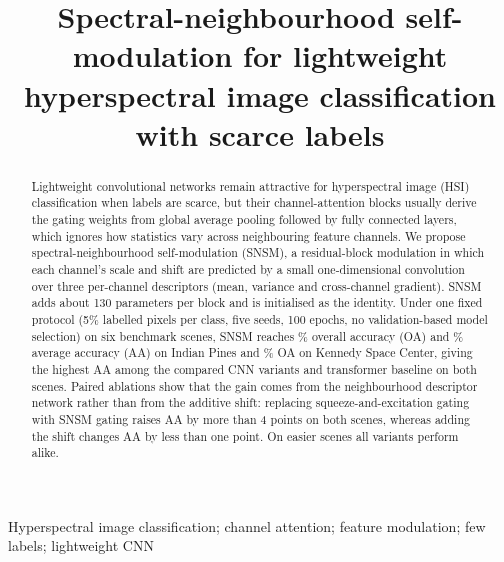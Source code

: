 \documentclass[]{interact}
\begin{document}

\title{Spectral-neighbourhood self-modulation for lightweight hyperspectral image classification with scarce labels}

\author{
}

\maketitle

\begin{abstract}
Lightweight convolutional networks remain attractive for hyperspectral image (HSI) classification when labels are scarce, but their channel-attention blocks usually derive the gating weights from global average pooling followed by fully connected layers, which ignores how statistics vary across neighbouring feature channels. We propose spectral-neighbourhood self-modulation (SNSM), a residual-block modulation in which each channel's scale and shift are predicted by a small one-dimensional convolution over three per-channel descriptors (mean, variance and cross-channel gradient). SNSM adds about 130 parameters per block and is initialised as the identity. Under one fixed protocol (5\% labelled pixels per class, five seeds, 100 epochs, no validation-based model selection) on six benchmark scenes, SNSM reaches \snsmIndianPinesOA\% overall accuracy (OA) and \snsmIndianPinesAA\% average accuracy (AA) on Indian Pines and \snsmKSCOA\% OA on Kennedy Space Center, giving the highest AA among the compared CNN variants and transformer baseline on both scenes. Paired ablations show that the gain comes from the neighbourhood descriptor network rather than from the additive shift: replacing squeeze-and-excitation gating with SNSM gating raises AA by more than 4 points on both scenes, whereas adding the shift changes AA by less than one point. On easier scenes all variants perform alike.
\end{abstract}

\begin{keywords}
Hyperspectral image classification; channel attention; feature modulation; few labels; lightweight CNN
\end{keywords}
\end{document}

